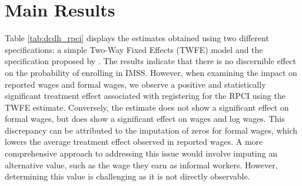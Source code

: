\documentclass[10pt, oneside]{book}
\begin{document}
\section{Main Results}

Table \ref{tab:dcdh_rpci} displays the estimates obtained using two different specifications: a simple Two-Way Fixed Effects (TWFE) model and the specification proposed by \cite{de2020two}. The results indicate that there is no discernible effect on the probability of enrolling in IMSS. However, when examining the impact on reported wages and formal wages, we observe a positive and statistically significant treatment effect associated with registering for the RPCI using the TWFE estimate. Conversely, the \cite{de2020two} estimate does not show a significant effect on formal wages, but does show a significant effect on wages and log wages. This discrepancy can be attributed to the imputation of zeros for formal wages, which lowers the average treatment effect observed in reported wages. A more comprehensive approach to addressing this issue would involve imputing an alternative value, such as the wage they earn as informal workers. However, determining this value is challenging as it is not directly observable. \\
\end{document}
